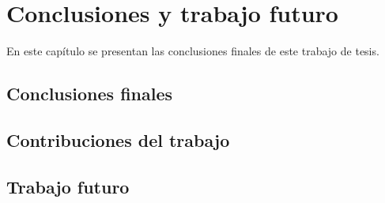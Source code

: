 \chapter{Conclusiones y trabajo futuro}\label{cap:conclusiones}

En este capítulo se presentan las conclusiones finales de este trabajo de tesis.

\section{Conclusiones finales}\label{sec:conclusiones-finales}

\section{Contribuciones del trabajo}\label{sec:conclusiones-contribuciones}

\section{Trabajo futuro}\label{sec:conclusiones-futuro}

